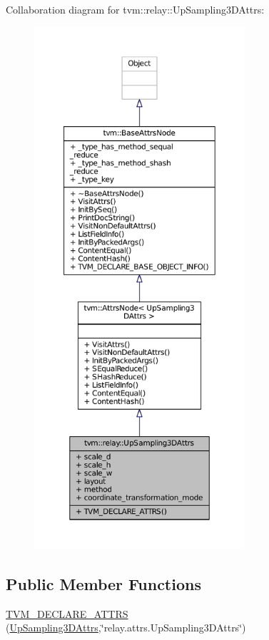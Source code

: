 Collaboration diagram for tvm\+:\+:relay\+:\+:Up\+Sampling3\+D\+Attrs\+:
\nopagebreak
\begin{figure}[H]
\begin{center}
\leavevmode
\includegraphics[height=550pt]{structtvm_1_1relay_1_1UpSampling3DAttrs__coll__graph}
\end{center}
\end{figure}
\subsection*{Public Member Functions}
\begin{DoxyCompactItemize}
\item 
\hyperlink{structtvm_1_1relay_1_1UpSampling3DAttrs_a2bb538ca08e7f318e24e088c482366a4}{T\+V\+M\+\_\+\+D\+E\+C\+L\+A\+R\+E\+\_\+\+A\+T\+T\+RS} (\hyperlink{structtvm_1_1relay_1_1UpSampling3DAttrs}{Up\+Sampling3\+D\+Attrs},\char`\"{}relay.\+attrs.\+Up\+Sampling3\+D\+Attrs\char`\"{})
\end{DoxyCompactItemize}
